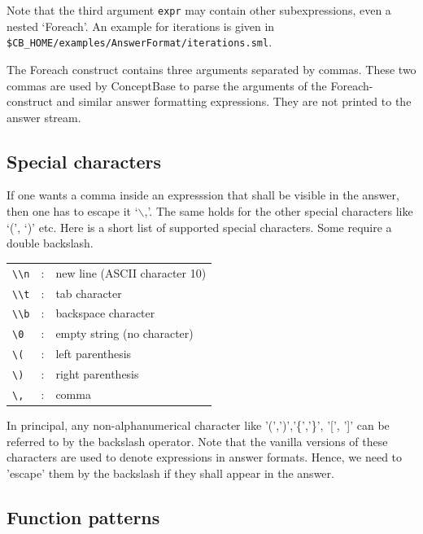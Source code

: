 Note that the third argument {\tt expr} may contain other subexpressions, even a nested `Foreach'.
An example for iterations is given in
\verb+$CB_HOME/examples/AnswerFormat/iterations.sml+.

The Foreach construct contains three arguments separated by commas. 
These two commas are used by ConceptBase to parse the arguments
of the Foreach-construct and similar answer formatting expressions.
They are not printed to the answer stream.

\subsection{Special characters}

If one wants a comma inside an expresssion that shall be
visible in the answer, then one has to escape it `$\backslash$,'.
The same holds for the other special characters like `(', `)' etc.
Here is a short list of supported special characters. Some require
a double backslash. \newline

\begin{tabular}{lcl}
   {\tt \textbackslash\textbackslash n} & : & new line (ASCII character 10)\\
   {\tt \textbackslash\textbackslash t} & : & tab character\\
   {\tt \textbackslash\textbackslash b} & : & backspace character\\
   {\tt \textbackslash 0} & :  & empty string (no character)\\
   {\tt \textbackslash (} & :  & left parenthesis\\
   {\tt \textbackslash )} & :  & right parenthesis\\
   {\tt \textbackslash ,} & :  & comma\\
\end{tabular}

\vspace{0.5cm}
In principal, any non-alphanumerical character like '(',')','\{','\}',
'[', ']' can be referred to by the backslash operator. Note that the
vanilla versions of these characters are used to denote expressions in
answer formats. Hence, we need to 'escape' them by the backslash if they
shall appear in the answer.


\subsection{Function patterns}
\label{subsec:externalproc}

